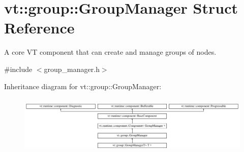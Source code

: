\hypertarget{structvt_1_1group_1_1_group_manager}{}\section{vt\+:\+:group\+:\+:Group\+Manager Struct Reference}
\label{structvt_1_1group_1_1_group_manager}


A core VT component that can create and manage groups of nodes.  




{\ttfamily \#include $<$group\+\_\+manager.\+h$>$}

Inheritance diagram for vt\+:\+:group\+:\+:Group\+Manager\+:\begin{figure}[H]
\begin{center}
\leavevmode
\includegraphics[height=2.889577cm]{structvt_1_1group_1_1_group_manager}
\end{center}
\end{figure}
